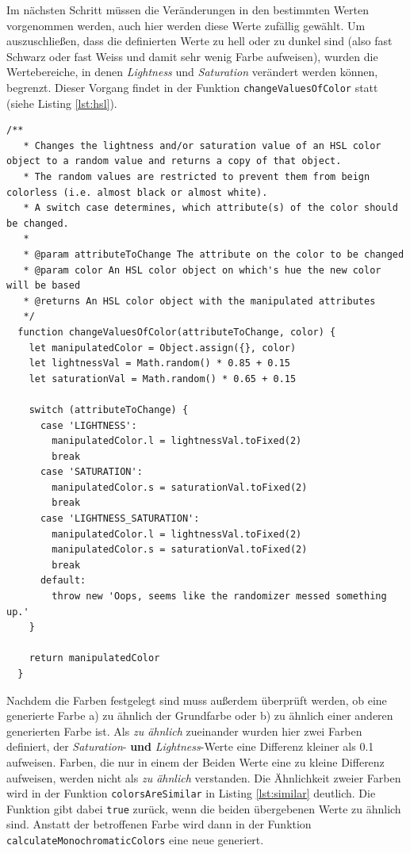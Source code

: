 Im nächsten Schritt müssen die Veränderungen in den bestimmten Werten vorgenommen werden, auch hier werden diese Werte zufällig gewählt. Um auszuschließen, dass die definierten Werte zu hell oder zu dunkel sind (also fast Schwarz oder fast Weiss und damit sehr wenig Farbe aufweisen), wurden die Wertebereiche, in denen \textit{Lightness} und \textit{Saturation} verändert werden können, begrenzt. Dieser Vorgang findet in der Funktion \verb|changeValuesOfColor| statt (siehe Listing \ref{lst:hsl}).

\begin{lstlisting}[caption=Setzen der HSL-Werte, label=lst:hsl]
  /**
   * Changes the lightness and/or saturation value of an HSL color object to a random value and returns a copy of that object.
   * The random values are restricted to prevent them from beign colorless (i.e. almost black or almost white).
   * A switch case determines, which attribute(s) of the color should be changed.
   *
   * @param attributeToChange The attribute on the color to be changed
   * @param color An HSL color object on which's hue the new color will be based
   * @returns An HSL color object with the manipulated attributes
   */
  function changeValuesOfColor(attributeToChange, color) {
    let manipulatedColor = Object.assign({}, color)
    let lightnessVal = Math.random() * 0.85 + 0.15
    let saturationVal = Math.random() * 0.65 + 0.15

    switch (attributeToChange) {
      case 'LIGHTNESS':
        manipulatedColor.l = lightnessVal.toFixed(2)
        break
      case 'SATURATION':
        manipulatedColor.s = saturationVal.toFixed(2)
        break
      case 'LIGHTNESS_SATURATION':
        manipulatedColor.l = lightnessVal.toFixed(2)
        manipulatedColor.s = saturationVal.toFixed(2)
        break
      default:
        throw new 'Oops, seems like the randomizer messed something up.'
    }

    return manipulatedColor
  }
\end{lstlisting}

Nachdem die Farben festgelegt sind muss außerdem überprüft werden, ob  eine generierte Farbe a) zu ähnlich der Grundfarbe oder b) zu ähnlich einer anderen generierten Farbe ist.
Als \textit{zu ähnlich} zueinander wurden hier zwei Farben definiert, der \textit{Saturation}- \textbf{und} \textit{Lightness}-Werte eine Differenz kleiner als 0.1 aufweisen. Farben, die nur in einem der Beiden Werte eine zu kleine Differenz aufweisen, werden nicht als \textit{zu ähnlich} verstanden.
Die Ähnlichkeit zweier Farben wird in  der Funktion \verb|colorsAreSimilar| in Listing \ref{lst:similar} deutlich. Die Funktion gibt dabei \verb|true| zurück, wenn die beiden übergebenen Werte zu ähnlich sind. Anstatt der betroffenen Farbe wird dann in der Funktion \verb|calculateMonochromaticColors| eine neue generiert.

